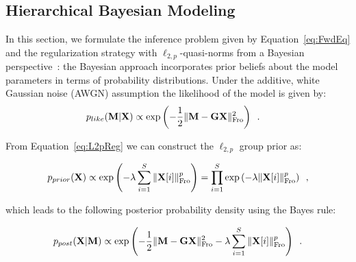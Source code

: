 \subsection{Hierarchical Bayesian Modeling}
\label{section:HBM}

In this section, we formulate the inference problem given by Equation~\eqref{eq:FwdEq} and the regularization strategy with $\ell_{2,p}$-quasi-norms from a Bayesian perspective~\cite{KaSo05,Lu14}: the Bayesian approach incorporates prior beliefs about the model parameters in terms of probability distributions. Under the additive, white Gaussian noise (AWGN) assumption the likelihood of the model is given by:
\begin{eqnarray} \label{eq:like}
p_{like}(\mathbf{M}|\mathbf{X}) &\propto \exp \left( - \frac{1}{2} \|{\mathbf{M} - \mathbf{G} \mathbf{X}}\|_{\rm Fro}^2 \right) \enspace.
\end{eqnarray}

From Equation~\eqref{eq:L2pReg} we can construct the $\ell_{2,p}$ group prior as:

\begin{equation} \label{eq:prior}
p_{prior}(\mathbf{X}) \propto \exp \left( - \lambda \sum_{i=1}^S \|{\mathbf{X}[i]}\|_{\rm Fro}^p \right)
= \prod_{i=1}^S \exp \left( - \lambda \|{\mathbf{X}[i]}\|_{\rm Fro}^p \right) \enspace,
\end{equation}

which leads to the following posterior probability density using the Bayes rule:

\begin{equation} \label{eq:post}
p_{post}(\mathbf{X}|\mathbf{M}) \propto \exp \left( - \frac{1}{2} \|{\mathbf{M} - \mathbf{G} \mathbf{X}}\|_{\rm Fro}^2 - \lambda \sum_{i=1}^S \|{\mathbf{X}[i]}\|_{\rm Fro}^p \right) \enspace.
\end{equation}


